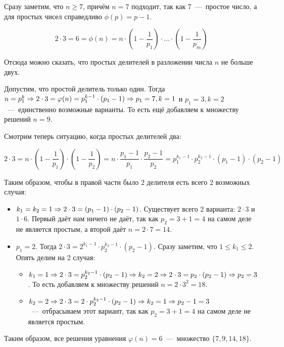 \documentclass[a4paper,12pt]{article}
\begin{document}
\begin{solution}
	Сразу заметим, что $n \ge 7$, причём $n = 7$ подходит, так как 7~---~простое число, а для простых чисел справедливо $\phi(p) = p-1$.
	
	$$2 \cdot 3 = 6 = \phi(n) = n \cdot \left(1 - \dfrac{1}{p_1}\right) \cdot \ldots \cdot \left(1 - \dfrac{1}{p_m}\right)$$
	
	Отсюда можно сказать, что простых делителей в разложении числа $n$ не больше двух. 
	
	Допустим, что простой делитель только один. Тогда $n = p_1^k \Rightarrow 2 \cdot 3 = \varphi(n) = p_1^{k-1} \cdot (p_1 - 1) \Rightarrow p_1 = 7, k = 1$ и $p_1 = 3, k = 2$~---~единственно возможные варианты. То есть ещё добавляем к множеству решений $n = 9$.
	
	Смотрим теперь ситуацию, когда простых делителей два:
	
	\[2 \cdot 3 = n \cdot \left(1 - \dfrac{1}{p_1}\right) \cdot \left(1 - \dfrac{1}{p_2}\right) = n \cdot \dfrac{p_1 - 1}{p_1} \cdot \dfrac{p_2 - 1}{p_2} = p_1^{k_1 - 1} \cdot p_2^{k_2-1} \cdot (p_1 - 1) \cdot (p_2 - 1)\]
	
	Таким образом, чтобы в правой части было 2 делителя есть всего 2 возможных случая:
	\begin{itemize}
		\item $k_1 = k_2 = 1 \Rightarrow 2 \cdot 3 = (p_1 - 1) \cdot (p_2 - 1)$. Существует всего 2 варианта: $2 \cdot 3$ и $1 \cdot 6$. Первый даёт нам ничего не даёт, так как $p_2 = 3 + 1 = 4$ на самом деле не является простым, а второй даёт $n = 2 \cdot 7 = 14$.
		\item $p_1 = 2$. Тогда $2\cdot 3 = 2^{k_1 - 1} \cdot p_2^{k_2-1} \cdot (p_2 - 1)$. Сразу заметим, что $1 \le k_1 \le 2$. Опять делим на 2 случая:
		
		\begin{itemize}
			\item $k_1 = 1 \Rightarrow 2 \cdot 3 = p_2^{k_2-1} \cdot (p_2 - 1) \Rightarrow k_2 = 2 \Rightarrow 2\cdot 3 =p_2 \cdot (p_2 - 1) \Rightarrow p_2 = 3$. То есть добавляем к множеству решений $n = 2 \cdot 3^2 = 18$.
			
			\item $k_2 = 2 \Rightarrow 2 \cdot 3 = 2 \cdot p_2^{k_2-1} \cdot (p_2 - 1) \Rightarrow k_2 = 1 \Rightarrow p_2 - 1 = 3$~---~отбрасываем этот вариант, так как $p_2 = 3 + 1 = 4$ на самом деле не является простым.
		\end{itemize}
	\end{itemize}

	Таким образом, все решения уравнения $\varphi(n) = 6$~---~множество $\{7, 9, 14, 18\}$.

\end{solution}
\end{document}
